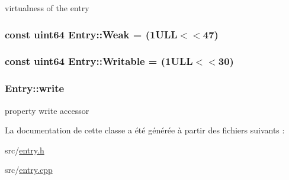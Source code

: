 virtualness of the entry 

\hypertarget{class_entry_ac4e4222ded00c776ad62dadac47d56e3}{}
\subsubsection[{Weak}]{\setlength{\rightskip}{0pt plus 5cm}const {\bf uint64} Entry\+::\+Weak = (1\+U\+L\+L$<$$<$47)\hspace{0.3cm}{\ttfamily [static]}}\label{class_entry_ac4e4222ded00c776ad62dadac47d56e3}
\hypertarget{class_entry_a25dcb70eced0093cf96d0cac37689f75}{}
\subsubsection[{Writable}]{\setlength{\rightskip}{0pt plus 5cm}const {\bf uint64} Entry\+::\+Writable = (1\+U\+L\+L$<$$<$30)\hspace{0.3cm}{\ttfamily [static]}}\label{class_entry_a25dcb70eced0093cf96d0cac37689f75}
\hypertarget{class_entry_a76a68a1f14534f069444ba2704ef7404}{}
\subsubsection[{write}]{ Entry\+::write}\label{class_entry_a76a68a1f14534f069444ba2704ef7404}


property write accessor 



La documentation de cette classe a été générée à partir des fichiers suivants \+:\begin{DoxyCompactItemize}
\item 
src/\hyperlink{entry_8h}{entry.\+h}\item 
src/\hyperlink{entry_8cpp}{entry.\+cpp}\end{DoxyCompactItemize}
